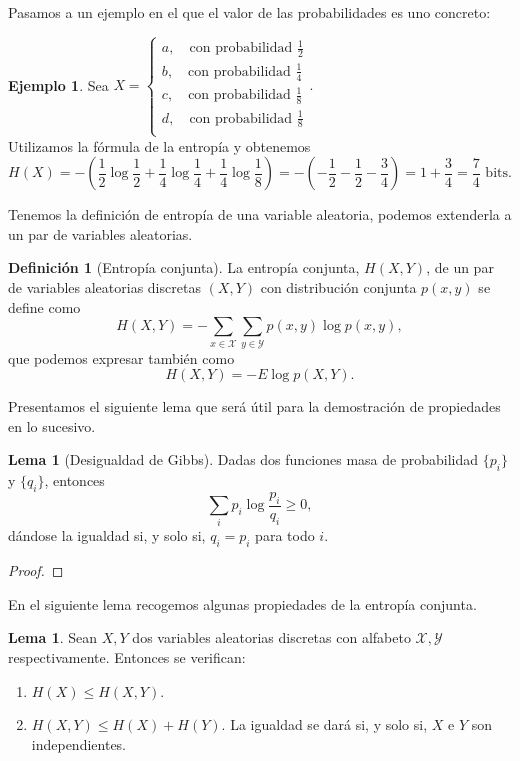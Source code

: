 \documentclass[10pt,a4paper]{article} %
\theoremstyle{definition}
\newtheorem{definition}{Definición}[section]
\newtheorem{lemma}[theorem]{Lema}
\newtheorem{example}[theorem]{Ejemplo}
\begin{document}
Pasamos a un ejemplo en el que el valor de las probabilidades es uno concreto:
\begin{example}
  Sea $X = 
     \begin{cases}
       a, \quad\text{con probabilidad } \frac{1}{2}\\
       b, \quad\text{con probabilidad } \frac{1}{4} \\
       c, \quad\text{con probabilidad } \frac{1}{8} \\
       d, \quad\text{con probabilidad } \frac{1}{8} \\
     \end{cases}.$ \\

     Utilizamos la fórmula de la entropía y obtenemos \[H(X) = - \left (\frac{1}{2} \log \frac{1}{2} + \frac{1}{4} \log \frac{1}{4} + \frac{1}{4} \log \frac{1}{8} \right ) = - \left (-\frac{1}{2} - \frac{1}{2} - \frac{3}{4} \right ) = 1 + \frac{3}{4} = \frac{7}{4} \text{ bits}.\]
\end{example}

Tenemos la definición de entropía de una variable aleatoria, podemos extenderla a un par de variables aleatorias.

\begin{definition}[Entropía conjunta]
  La entropía conjunta, $H(X,Y)$, de un par de variables aleatorias discretas $(X,Y)$ con distribución conjunta $p(x,y)$ se define como \[
  H(X,Y) = - \sum_{x \in \mathcal{X}} \sum_{y \in \mathcal{Y}} p(x,y) \log p(x,y), \]
  que podemos expresar también como \[
  H(X,Y) = - E \log p(X,Y).\]
\end{definition}
Presentamos el siguiente lema que será útil para la demostración de propiedades en lo sucesivo.

\begin{lemma}[Desigualdad de Gibbs]\label{l:gibbs}
  Dadas dos funciones masa de probabilidad $\{p_i\}$ y $\{q_i\}$, entonces \[
\sum_i p_i \log \frac{p_i}{q_i} \ge 0,
\]
dándose la igualdad si, y solo si, $q_i = p_i$ para todo $i$.
\end{lemma}

\begin{proof}
\end{proof}

En el siguiente lema recogemos algunas propiedades de la entropía conjunta.

\begin{lemma}\label{l:prop_ent_conj} Sean $X, Y$ dos variables aleatorias discretas con alfabeto $\mathcal{X}, \mathcal{Y}$ respectivamente. Entonces se verifican:
  \begin{enumerate}
  \item $H(X) \le H(X, Y)$.
  \item $H(X,Y) \le H(X) + H(Y)$. La igualdad se dará si, y solo si, $X$ e $Y$ son independientes.
  \end{enumerate}
\end{lemma}
\end{document}
